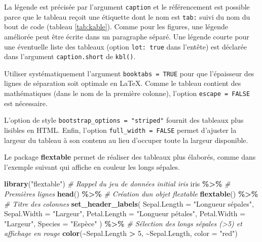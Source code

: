 \documentclass[
  12pt,
  french,
  a4paper,
  extrafontsizes,onecolumn,openright
  ]{memoir}
\newenvironment{Shaded}{\begin{snugshade}}{\end{snugshade}}
\newcommand{\AttributeTok}[1]{\textcolor[rgb]{0.13,0.29,0.53}{#1}}
\newcommand{\CommentTok}[1]{\textcolor[rgb]{0.56,0.35,0.01}{\textit{#1}}}
\newcommand{\DecValTok}[1]{\textcolor[rgb]{0.00,0.00,0.81}{#1}}
\newcommand{\FunctionTok}[1]{\textcolor[rgb]{0.13,0.29,0.53}{\textbf{#1}}}
\newcommand{\NormalTok}[1]{#1}
\newcommand{\SpecialCharTok}[1]{\textcolor[rgb]{0.81,0.36,0.00}{\textbf{#1}}}
\newcommand{\StringTok}[1]{\textcolor[rgb]{0.31,0.60,0.02}{#1}}
\begin{document}
\normalsize

La légende est précisée par l'argument \texttt{caption} et le référencement est possible parce que le tableau reçoit une étiquette dont le nom est \texttt{tab:} suivi du nom du bout de code (tableau \ref{tab:kable}).
Comme pour les figures, une légende améliorée peut être écrite dans un paragraphe séparé.
Une légende courte pour une éventuelle liste des tableaux (option \texttt{lot:\ true} dans l'entête) est déclarée dans l'argument \texttt{caption.short} de \texttt{kbl()}.

Utiliser systématiquement l'argument \texttt{booktabs\ =\ TRUE} pour que l'épaisseur des lignes de séparation soit optimale en LaTeX.
Comme le tableau contient des mathématiques (dans le nom de la première colonne), l'option \texttt{escape\ =\ FALSE} est nécessaire.

L'option de style \texttt{bootstrap\_options\ =\ "striped"} fournit des tableaux plus lisibles en HTML.
Enfin, l'option \texttt{full\_width\ =\ FALSE} permet d'ajuster la largeur du tableau à son contenu au lieu d'occuper toute la largeur disponible.

Le package \textbf{flextable} permet de réaliser des tableaux plus élaborés, comme dans l'exemple suivant qui affiche en couleur les longs sépales.

\scriptsize

\begin{Shaded}
\begin{Highlighting}[]
\FunctionTok{library}\NormalTok{(}\StringTok{"flextable"}\NormalTok{)}
\CommentTok{\# Rappel du jeu de données initial iris}
\NormalTok{iris }\SpecialCharTok{\%\textgreater{}\%}
  \CommentTok{\# Premières lignes}
  \FunctionTok{head}\NormalTok{() }\SpecialCharTok{\%\textgreater{}\%} 
  \CommentTok{\# Création d\textquotesingle{}un objet flextable}
  \FunctionTok{flextable}\NormalTok{() }\SpecialCharTok{\%\textgreater{}\%}
  \CommentTok{\# Titre des colonnes}
  \FunctionTok{set\_header\_labels}\NormalTok{(}
    \AttributeTok{Sepal.Length =} \StringTok{"Longueur sépales"}\NormalTok{,}
    \AttributeTok{Sepal.Width =} \StringTok{"Largeur"}\NormalTok{, }
    \AttributeTok{Petal.Length =} \StringTok{"Longueur pétales"}\NormalTok{,}
    \AttributeTok{Petal.Width =} \StringTok{"Largeur"}\NormalTok{,}
    \AttributeTok{Species =} \StringTok{"Espèce"}
\NormalTok{  ) }\SpecialCharTok{\%\textgreater{}\%}
  \CommentTok{\# Sélection des longs sépales (\textgreater{}5) et affichage en rouge}
  \FunctionTok{color}\NormalTok{(}\SpecialCharTok{\textasciitilde{}}\NormalTok{Sepal.Length }\SpecialCharTok{\textgreater{}} \DecValTok{5}\NormalTok{, }\SpecialCharTok{\textasciitilde{}}\NormalTok{Sepal.Length, }\AttributeTok{color =} \StringTok{"red"}\NormalTok{)}
\end{Highlighting}
\end{Shaded}
\end{document}
